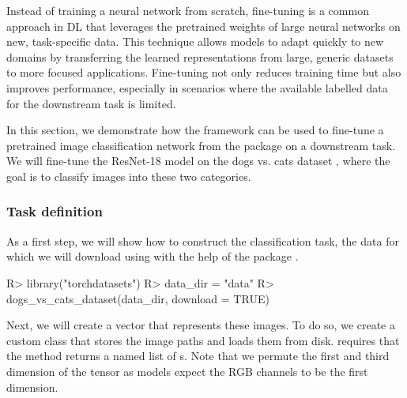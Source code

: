 \documentclass[article]{jss}
\theoremstyle{definition}
\begin{document}
Instead of training a neural network from scratch, fine-tuning is a common approach in DL that leverages the pretrained weights of large neural networks on new, task-specific data.
This technique allows models to adapt quickly to new domains by transferring the learned representations from large, generic datasets to more focused applications.
Fine-tuning not only reduces training time but also improves performance, especially in scenarios where the available labelled data for the downstream task is limited.

In this section, we demonstrate how the  framework can be used to fine-tune a pretrained image classification network from the  package on a downstream task.
We will fine-tune the ResNet-18 model \citep{ref-he2015deepresiduallearningimage} on the dogs vs. cats dataset \citep{ref-dogs-vs-cats2013}, where the goal is to classify images into these two categories.

\subsubsection{Task definition}

As a first step, we will show how to construct the classification task, the data for which we will download using with the help of the  \rlang{} package \citep{torchdatasets}.

\begin{CodeInput}
R> library("torchdatasets")
R> data_dir = "data"
R> dogs_vs_cats_dataset(data_dir, download = TRUE)
\end{CodeInput}

Next, we will create a  vector that represents these images.
To do so, we create a custom  class that stores the image paths and loads them from disk.
 requires that the  method returns a named list of s.
Note that we permute the first and third dimension of the tensor as  models expect the RGB channels to be the first dimension.

\end{document}
